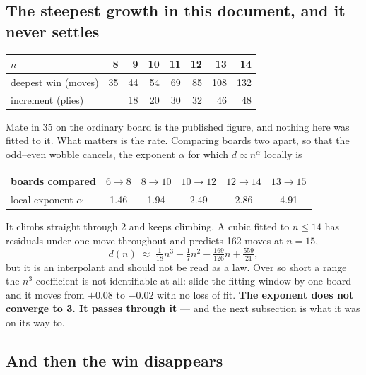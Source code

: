 \documentclass[11pt]{article}
\begin{document}
\subsection{The steepest growth in this document, and it never settles}\label{sub:kqkr-growth}

\begin{center}\small
\begin{tabular}{@{}lrrrrrrr@{}}
\toprule
$n$ & 8 & 9 & 10 & 11 & 12 & 13 & 14 \\
\midrule
deepest win (moves) & 35 & 44 & 54 & 69 & 85 & 108 & 132 \\
increment (plies)   &    & 18 & 20 & 30 & 32 & 46 & 48 \\
\bottomrule
\end{tabular}
\end{center}

\noindent
Mate in 35 on the ordinary board is the published figure, and nothing here was
fitted to it. What matters is the rate. Comparing boards two apart, so that the
odd--even wobble cancels, the exponent $\alpha$ for which $d \propto n^{\alpha}$
locally is

\begin{center}\small
\begin{tabular}{@{}lccccc@{}}
\toprule
boards compared & $6\to8$ & $8\to10$ & $10\to12$ & $12\to14$ & $13\to15$ \\
\midrule
local exponent $\alpha$ & 1.46 & 1.94 & 2.49 & 2.86 & 4.91 \\
\bottomrule
\end{tabular}
\end{center}

\noindent
It climbs straight through 2 and keeps climbing. A cubic fitted to $n \le 14$
has residuals under one move throughout and predicts 162 moves at $n=15$,
\[ d(n) \;\approx\; \tfrac{1}{18}n^{3} - \tfrac{1}{7}n^{2}
   - \tfrac{169}{126}n + \tfrac{559}{21}, \]
but it is an interpolant and should not be read as a law. Over so short a range
the $n^3$ coefficient is not identifiable at all: slide the fitting window by
one board and it moves from $+0.08$ to $-0.02$ with no loss of fit.
\textbf{The exponent does not converge to 3. It passes through it} --- and the
next subsection is what it was on its way to.

\subsection{And then the win disappears}\label{sub:kqkr-vanish}
\end{document}
